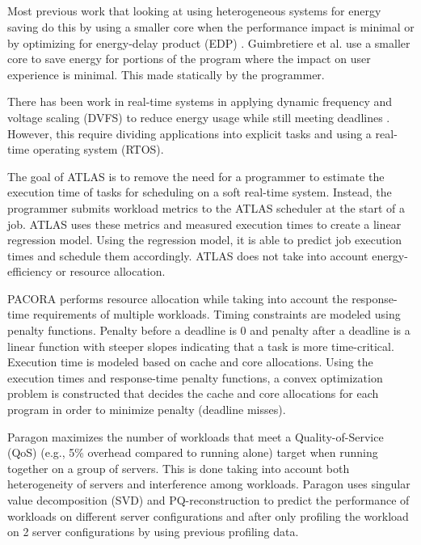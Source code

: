 \subsection{}

Most previous work that looking at using heterogeneous systems for energy
saving do this by using a smaller core when the performance impact is minimal
\cite{padmanabha-micro13, heteroscouts-sigmetrics11, pie-isca12} or by
optimizing for energy-delay product (EDP) \cite{cong-islped12, kumar-micro03,
chen-dac09}.
Guimbretiere et al. \cite{guimbretiere-tecs11} use a smaller core to save
energy for portions of the program where the impact on user experience is
minimal. This made statically by the programmer.

There has been work in real-time systems in applying dynamic frequency and
voltage scaling (DVFS) to reduce energy usage while still meeting deadlines
\cite{rtdvfs-systor12}. However, this require dividing applications into
explicit tasks and using a real-time operating system (RTOS).


The goal of ATLAS \cite{atlas-rtas13} is to remove the need for a programmer to
estimate the execution time of tasks for scheduling on a soft real-time system.
Instead, the programmer submits workload metrics to the ATLAS scheduler at the
start of a job. ATLAS uses these metrics and measured execution times to create
a linear regression model. Using the regression model, it is able to predict
job execution times and schedule them accordingly. ATLAS does not take into
account energy-efficiency or resource allocation.

PACORA \cite{pacora-hotpar11} performs resource allocation while taking into
account the response-time requirements of multiple workloads.  Timing
constraints are modeled using penalty functions. Penalty before a deadline is 0
and penalty after a deadline is a linear function with steeper slopes
indicating that a task is more time-critical. Execution time is modeled based
on cache and core allocations. Using the execution times and response-time
penalty functions, a convex optimization problem is constructed that decides
the cache and core allocations for each program in order to minimize penalty
(deadline misses).

Paragon \cite{paragon-asplos13} maximizes the number of workloads that meet a
Quality-of-Service (QoS) (e.g., 5\% overhead compared to running alone) target
when running together on a group of servers. This is done taking into account
both heterogeneity of servers and interference among workloads. Paragon uses
singular value decomposition (SVD) and PQ-reconstruction to predict the
performance of workloads on different server configurations and after only
profiling the workload on 2 server configurations by using previous profiling
data.

